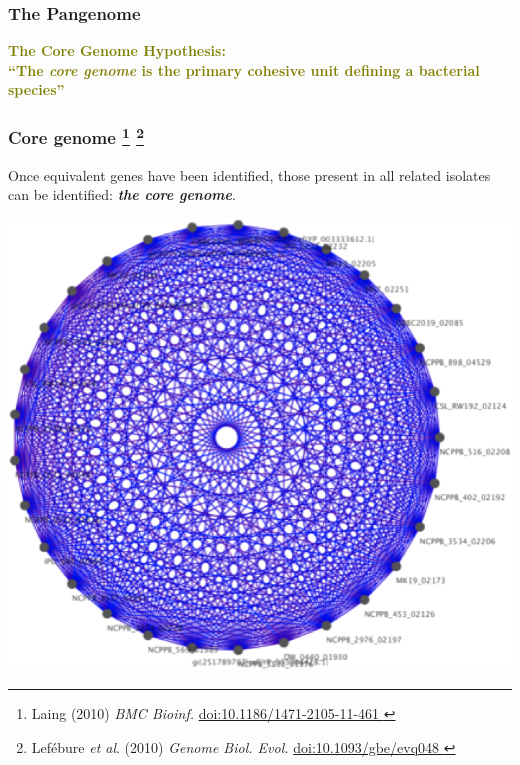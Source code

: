 
%
\begin{frame}
  \frametitle{The Pangenome
  }
  \Large{
    \textcolor{olive}{
      \textbf{
      The Core Genome Hypothesis: \\
      ``The \textit{core genome} is the primary cohesive unit defining a bacterial species''
      }
    }
  }
\end{frame}

\begin{frame}
  \frametitle{Core genome   
  \footnote{\tiny{Laing (2010) \textit{BMC Bioinf.} \href{http://dx.doi.org/10.1186/1471-2105-11-461}{doi:10.1186/1471-2105-11-461
  }}}
    \footnote{\tiny{Lef\'{e}bure \textit{et al}. (2010) \textit{Genome Biol. Evol.} \href{http://dx.doi.org/10.1371/10.1093/gbe/evq048}{doi:10.1093/gbe/evq048
    }}}  
}
  \textcolor{hutton_green}{Once equivalent genes have been identified, those present in all related isolates can be identified: \textbf{\textit{the core genome}}.}\\
  \begin{center}
      \includegraphics[height=0.55\textheight]{images/core_cluster}
  \end{center}
\end{frame}

